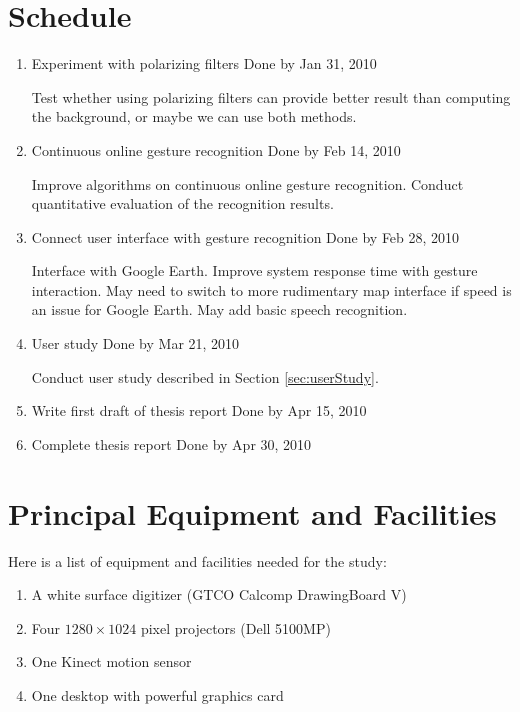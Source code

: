 \section{Schedule}
\begin{enumerate}
  \item Experiment with polarizing filters \hfill Done by Jan 31, 2010

  Test whether using polarizing filters can provide better result than computing
the background, or maybe we can use both methods.

  \item Continuous online gesture recognition \hfill Done by Feb 14, 2010

  Improve algorithms on continuous online gesture recognition. Conduct
quantitative evaluation of the recognition results.

  \item Connect user interface with gesture recognition	\hfill Done by Feb 28,
2010

  Interface with Google Earth. Improve system response time with gesture
interaction. May need to switch to more rudimentary map interface if speed is an issue for Google Earth. May add basic speech recognition.

  \item User study \hfill Done by Mar 21, 2010

  Conduct user study described in Section \ref{sec:userStudy}.

  \item Write first draft of thesis report \hfill Done by Apr 15, 2010
  \item Complete thesis report	\hfill Done by Apr 30, 2010
  \end{enumerate}

\section{Principal Equipment and Facilities}
Here is a list of equipment and facilities needed for the study:

\begin{enumerate}
  \item A white surface digitizer (GTCO Calcomp DrawingBoard V)
  \item Four $1280\times1024$ pixel projectors (Dell 5100MP)
  \item One Kinect motion sensor
  \item One desktop with powerful graphics card
\end{enumerate}

